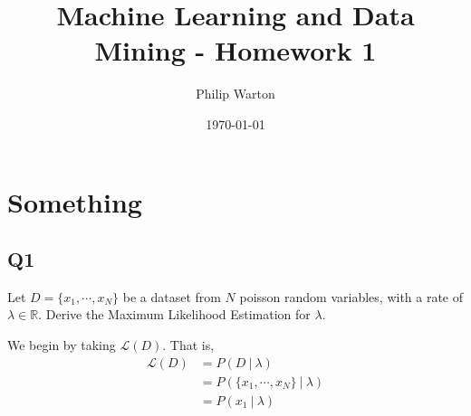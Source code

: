 \documentclass{article}
\theoremstyle{definition}
\begin{document}
\title{Machine Learning and Data Mining - Homework 1}
\author{Philip Warton}
\date{\today}
\maketitle
\section{Something}
    \subsection{Q1}
        \begin{mdframed}[]
            Let $D = \{x_1,\cdots,x_N\}$ be a dataset from $N$ poisson random variables, with a rate 
            of $\lambda \in \mathbb{R}$. Derive the Maximum Likelihood Estimation for $\lambda$.
        \end{mdframed}
        We begin by taking $\mathcal{L}(D)$. That is,
        \begin{align*}
            \mathcal{L}(D) &= P(D \ | \ \lambda) \\
            &=P(\{x_1,\cdots,x_N\} \ | \ \lambda) \\
            &=P(x_1 \ | \ \lambda )
        \end{align*}
\end{document}
